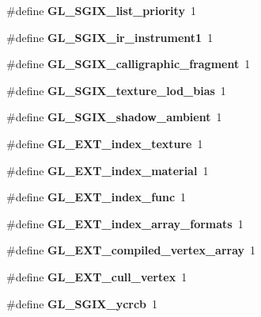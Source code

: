 \begin{DoxyCompactItemize}
\item 
\#define {\bfseries G\+L\+\_\+\+S\+G\+I\+X\+\_\+list\+\_\+priority}~1\label{_s_d_l__opengl_8h_a0f4a24c9dc0f2a49e3af1e0edb8b09ea}

\item 
\#define {\bfseries G\+L\+\_\+\+S\+G\+I\+X\+\_\+ir\+\_\+instrument1}~1\label{_s_d_l__opengl_8h_ab3364bdf527f87d21b1c7c225b7d401c}

\item 
\#define {\bfseries G\+L\+\_\+\+S\+G\+I\+X\+\_\+calligraphic\+\_\+fragment}~1\label{_s_d_l__opengl_8h_a519886f353aa5d898636bc80a9438122}

\item 
\#define {\bfseries G\+L\+\_\+\+S\+G\+I\+X\+\_\+texture\+\_\+lod\+\_\+bias}~1\label{_s_d_l__opengl_8h_a5b179ad4a4c43c2e44ce1c7bb5e7b756}

\item 
\#define {\bfseries G\+L\+\_\+\+S\+G\+I\+X\+\_\+shadow\+\_\+ambient}~1\label{_s_d_l__opengl_8h_a4b45dc6df9775b2179cc9d61d5730ee9}

\item 
\#define {\bfseries G\+L\+\_\+\+E\+X\+T\+\_\+index\+\_\+texture}~1\label{_s_d_l__opengl_8h_a0c4e933348e15138cf57bbaef4c61041}

\item 
\#define {\bfseries G\+L\+\_\+\+E\+X\+T\+\_\+index\+\_\+material}~1\label{_s_d_l__opengl_8h_af3b2109964d57c83f135c58a206f2644}

\item 
\#define {\bfseries G\+L\+\_\+\+E\+X\+T\+\_\+index\+\_\+func}~1\label{_s_d_l__opengl_8h_a012c21f1da736a072754b54a387c224d}

\item 
\#define {\bfseries G\+L\+\_\+\+E\+X\+T\+\_\+index\+\_\+array\+\_\+formats}~1\label{_s_d_l__opengl_8h_aa40ceda988bbf83ecaa34c6359505bf5}

\item 
\#define {\bfseries G\+L\+\_\+\+E\+X\+T\+\_\+compiled\+\_\+vertex\+\_\+array}~1\label{_s_d_l__opengl_8h_a6c62c07e0bf28da1b5de72029b4bff20}

\item 
\#define {\bfseries G\+L\+\_\+\+E\+X\+T\+\_\+cull\+\_\+vertex}~1\label{_s_d_l__opengl_8h_a4f1335a4f692feea8bd9b0af3ff3ffcd}

\item 
\#define {\bfseries G\+L\+\_\+\+S\+G\+I\+X\+\_\+ycrcb}~1\label{_s_d_l__opengl_8h_aefd598cf07cc51cc8c5cacfa5d979e8f}


\end{DoxyCompactItemize}
